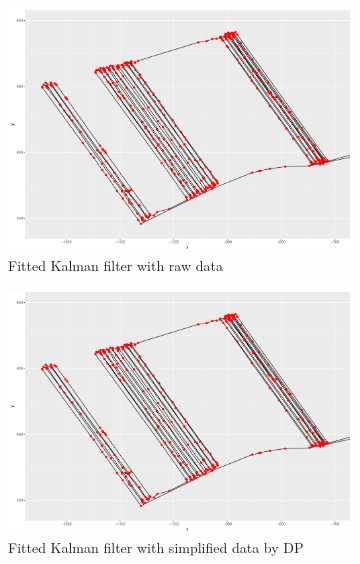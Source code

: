 \begin{figure}
\centering
\begin{subfigure}[t]{0.47\textwidth}
\includegraphics[width=\linewidth]{Chapters/06Spinoff/plot/ggRawKF2.pdf}
\caption{Fitted Kalman filter with raw data}
\end{subfigure}
 \begin{subfigure}[t]{0.47\textwidth}
\includegraphics[width=\linewidth]{Chapters/06Spinoff/plot/ggDPKF2.pdf}
\caption{Fitted Kalman filter with simplified data by DP}
\end{subfigure}
 \begin{subfigure}[t]{0.47\textwidth}

\end{subfigure}
\end{figure}
